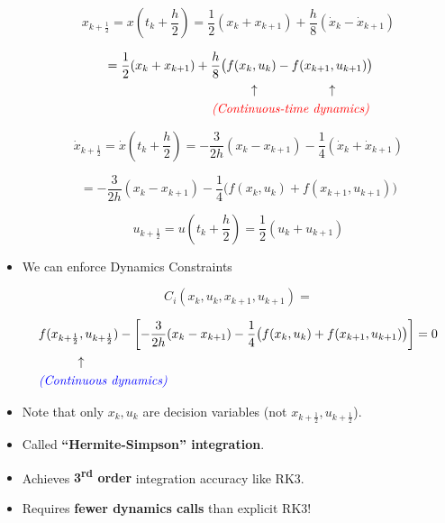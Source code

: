 \documentclass[11pt]{article}
\begin{document}
\begin{itemize}
\begin{equation*}
    x_{k+\frac{1}{2}} = x(t_k + \frac{h}{2}) = \frac{1}{2} (x_k + x_{k+1}) + \frac{h}{8} (\dot{x}_k - \dot{x}_{k+1})
\end{equation*}

\begin{align*}
   & = \frac{1}{2} (x_k + x_{k+1}) + \frac{h}{8} \big( f(x_k, u_k) - f(x_{k+1}, u_{k+1}) \big)
    \\
    &\hspace{40mm}\uparrow \hspace{20mm}\uparrow
\\
&\hspace{30mm}\textcolor{red}{\textit{(Continuous-time dynamics)}}
\end{align*}


\begin{equation*}
    \dot{x}_{k+\frac{1}{2}} = \dot{x}(t_k + \frac{h}{2}) = -\frac{3}{2h} (x_k - x_{k+1}) - \frac{1}{4} (\dot{x}_k + \dot{x}_{k+1})
\end{equation*}

\begin{equation*}
    = -\frac{3}{2h} (x_k - x_{k+1}) - \frac{1}{4} \big( f(x_k, u_k) + f(x_{k+1}, u_{k+1}) \big)
\end{equation*}

\begin{equation*}
    u_{k+\frac{1}{2}} = u(t_k + \frac{h}{2}) = \frac{1}{2} (u_k + u_{k+1})
\end{equation*}

\item{We can enforce Dynamics Constraints}

\begin{equation*}
    C_i (x_k, u_k, x_{k+1}, u_{k+1}) =
\end{equation*}

\begin{align*}
    &f(x_{k+\frac{1}{2}}, u_{k+\frac{1}{2}}) - \left[ -\frac{3}{2h} (x_k - x_{k+1}) - \frac{1}{4} \big( f(x_k, u_k) + f(x_{k+1}, u_{k+1}) \big) \right] = 0\\
   &\hspace{10mm} \uparrow\\
&\textcolor{blue}{\textit{(Continuous dynamics)}}
\end{align*}



    \item Note that only $x_k, u_k$ are decision variables (not $x_{k+\frac{1}{2}}, u_{k+\frac{1}{2}}$).
    \item Called \textbf{``Hermite-Simpson'' integration}.
    \item Achieves \textbf{3\textsuperscript{rd} order} integration accuracy like RK3.
    \item Requires \textbf{fewer dynamics calls} than explicit RK3!

\end{itemize}
\end{document}
